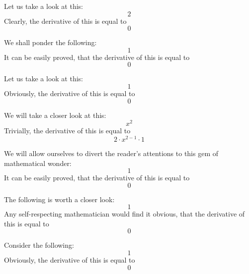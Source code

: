 \documentclass{article}
\begin{document}
Let us take a look at this:
\begin{equation}
2 
\end{equation}
Clearly, the derivative of this is equal to
\begin{equation}
0 
\end{equation}

We shall ponder the following:
\begin{equation}
1 
\end{equation}
It can be easily proved, that the derivative of this is equal to
\begin{equation}
0 
\end{equation}

Let us take a look at this:
\begin{equation}
1 
\end{equation}
Obviously, the derivative of this is equal to
\begin{equation}
0 
\end{equation}

We will take a closer look at this:
\begin{equation}
x ^{2 } 
\end{equation}
Trivially, the derivative of this is equal to
\begin{equation}
2 \cdot x ^{2 - 1 } \cdot 1 
\end{equation}

We will allow ourselves to divert the reader's attentions to this gem of mathematical wonder:
\begin{equation}
1 
\end{equation}
It can be easily proved, that the derivative of this is equal to
\begin{equation}
0 
\end{equation}

The following is worth a closer look:
\begin{equation}
1 
\end{equation}
Any self-respecting mathematician would find it obvious, that the derivative of this is equal to
\begin{equation}
0 
\end{equation}

Consider the following:
\begin{equation}
1 
\end{equation}
Obviously, the derivative of this is equal to
\begin{equation}
0 
\end{equation}
\end{document}
